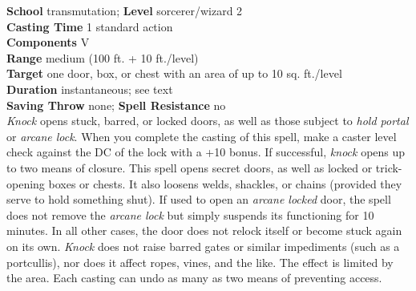 \textbf{School} transmutation; \textbf{Level} sorcerer/wizard 2\\
\textbf{Casting Time} 1 standard action\\
\textbf{Components} V\\
\textbf{Range }medium (100 ft. + 10 ft./level)\\
\textbf{Target} one door, box, or chest with an area of up to 10 sq. ft./level\\
\textbf{Duration} instantaneous; see text\\
\textbf{Saving Throw} none; \textbf{Spell Resistance} no\\
\textit{Knock }opens stuck, barred, or locked doors, as well as those subject to \textit{hold portal }or \textit{arcane lock}. When you complete the casting of this spell, make a caster level check against the DC of the lock with a +10 bonus. If successful, \textit{knock }opens up to two means of closure. This spell opens secret doors, as well as locked or trick-opening boxes or chests. It also loosens welds, shackles, or chains (provided they serve to hold something shut). If used to open an \textit{arcane locked }door, the spell does not remove the \textit{arcane lock }but simply suspends its functioning for 10 minutes. In all other cases, the door does not relock itself or become stuck again on its own. \textit{Knock }does not raise barred gates or similar impediments (such as a portcullis), nor does it affect ropes, vines, and the like. The effect is limited by the area. Each casting can undo as many as two means of preventing access. \\
